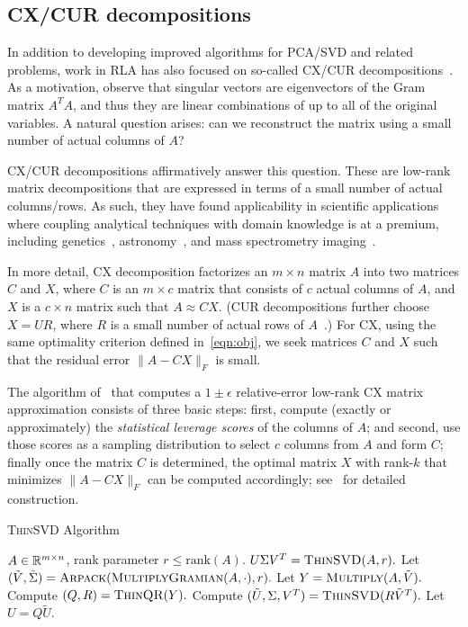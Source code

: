 \subsection{CX/CUR decompositions}

In addition to developing improved algorithms for PCA/SVD and related problems,
work in RLA has also focused on so-called CX/CUR
decompositions~\cite{DMM08,CUR_PNAS}.  As a motivation, observe that singular
vectors are eigenvectors of the Gram matrix $A^TA$, and thus they are linear
combinations of up to all of the original variables.  A natural question
arises: can we reconstruct the matrix using a small number of actual columns of
$A$?

CX/CUR decompositions affirmatively answer this question. These are
low-rank matrix decompositions that are expressed in terms of a small number of
actual columns/rows. As such, they have found applicability in scientific
applications where coupling analytical techniques with domain knowledge is at a
premium, including genetics~\cite{Paschou07b}, astronomy~\cite{Yip14-AJ}, and
mass spectrometry imaging~\cite{YRPMB15}.

In more detail, CX decomposition factorizes an $m \times n$ matrix $A$ into two
matrices $C$ and $X$, where $C$ is an $m\times c$ matrix that consists of $c$
actual columns of $A$, and $X$ is a $c \times n$ matrix such that $A\approx
CX$.
(CUR decompositions further choose $X=UR$, where $R$ is a small number of actual rows
of $A$~\cite{DMM08,CUR_PNAS}.)
For CX, using the same optimality criterion defined in~\eqref{eqn:obj}, we seek
matrices $C$ and $X$ such that the residual error $\|A-CX\|_F$ is small.

The algorithm of~\cite{DMM08} that computes a $1\pm\epsilon$ relative-error
low-rank CX matrix approximation consists of three basic steps: first, compute
(exactly or approximately) the {\it statistical leverage scores} of the columns
of $A$; and second, use those scores as a sampling distribution to select $c$
columns from $A$ and form $C$; finally once the matrix $C$ is determined, the
optimal matrix $X$ with rank-$k$ that minimizes $\|A-CX\|_F$ can be computed
accordingly; see~\cite{DMM08} for detailed construction. 

\begin{algorithm}[tb]
  \caption{\textsc{ThinSVD} Algorithm}
  \label{alg:truncatedSVD}
  \begin{algorithmic}[1]
    \Require $A \in \mathbb{R}^{m\times n}$, rank parameter $r \leq \textrm{rank}(A).$
    \Ensure $U \Sigma V^T = \textsc{ThinSVD}(A, r).$
    \State Let $(\tilde{V}, \tilde{\Sigma}) = \textsc{Arpack}(\textsc{MultiplyGramian}(A, \cdot), r).$
    \State Let $Y = \textsc{Multiply}(A, \tilde{V}).$
    \State Compute $(Q, R) = \textsc{ThinQR}(Y).$
    \State Compute $(\tilde{U}, \Sigma, V^T) = \textsc{ThinSVD}(R \tilde{V}^T).$
    \State Let $U = Q \tilde{U}.$  
  \end{algorithmic}
\end{algorithm}

